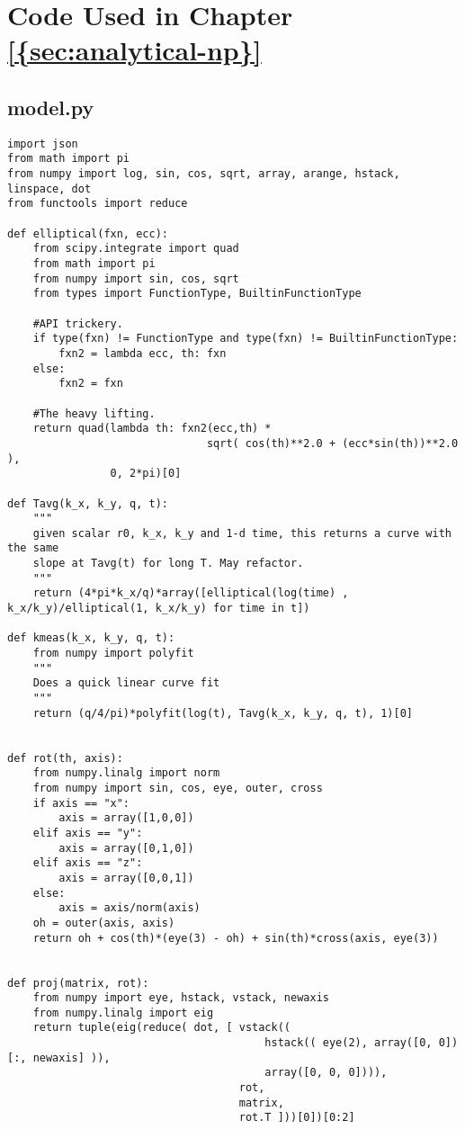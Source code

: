 \chapter{Code Used in Chapter \ref{{sec:analytical-np}}}
\label{apx:analytical-np}

\section{model.py}

\small
\begin{verbatim}
import json
from math import pi
from numpy import log, sin, cos, sqrt, array, arange, hstack, linspace, dot
from functools import reduce

def elliptical(fxn, ecc):
    from scipy.integrate import quad
    from math import pi
    from numpy import sin, cos, sqrt
    from types import FunctionType, BuiltinFunctionType

    #API trickery.
    if type(fxn) != FunctionType and type(fxn) != BuiltinFunctionType:
        fxn2 = lambda ecc, th: fxn
    else:
        fxn2 = fxn

    #The heavy lifting.
    return quad(lambda th: fxn2(ecc,th) *
                               sqrt( cos(th)**2.0 + (ecc*sin(th))**2.0 ),
                0, 2*pi)[0]

def Tavg(k_x, k_y, q, t):
    """
    given scalar r0, k_x, k_y and 1-d time, this returns a curve with the same 
    slope at Tavg(t) for long T. May refactor.
    """
    return (4*pi*k_x/q)*array([elliptical(log(time) , k_x/k_y)/elliptical(1, k_x/k_y) for time in t])

def kmeas(k_x, k_y, q, t):
    from numpy import polyfit
    """
    Does a quick linear curve fit 
    """
    return (q/4/pi)*polyfit(log(t), Tavg(k_x, k_y, q, t), 1)[0]


def rot(th, axis):
    from numpy.linalg import norm
    from numpy import sin, cos, eye, outer, cross
    if axis == "x":
        axis = array([1,0,0])
    elif axis == "y":
        axis = array([0,1,0])
    elif axis == "z":
        axis = array([0,0,1])
    else:
        axis = axis/norm(axis)
    oh = outer(axis, axis)
    return oh + cos(th)*(eye(3) - oh) + sin(th)*cross(axis, eye(3))
    

def proj(matrix, rot):
    from numpy import eye, hstack, vstack, newaxis
    from numpy.linalg import eig
    return tuple(eig(reduce( dot, [ vstack((
                                        hstack(( eye(2), array([0, 0])[:, newaxis] )),
                                        array([0, 0, 0]))),
                                    rot,
                                    matrix,
                                    rot.T ]))[0])[0:2]



\end{verbatim}
